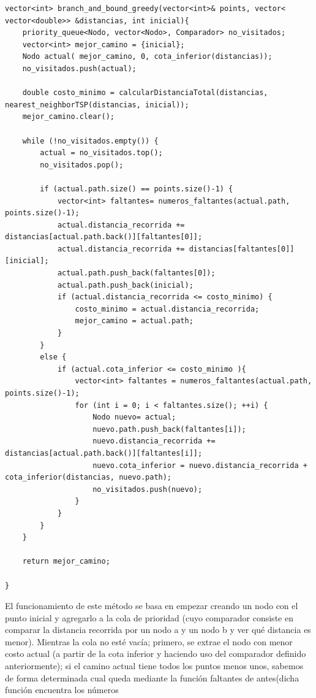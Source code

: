 \documentclass[11pt,openany]{book}
\begin{document}
\begin{lstlisting}
vector<int> branch_and_bound_greedy(vector<int>& points, vector< vector<double>> &distancias, int inicial){
    priority_queue<Nodo, vector<Nodo>, Comparador> no_visitados;
    vector<int> mejor_camino = {inicial};
    Nodo actual( mejor_camino, 0, cota_inferior(distancias));
    no_visitados.push(actual);

    double costo_minimo = calcularDistanciaTotal(distancias, nearest_neighborTSP(distancias, inicial));
    mejor_camino.clear();

    while (!no_visitados.empty()) {
        actual = no_visitados.top();
        no_visitados.pop();

        if (actual.path.size() == points.size()-1) {
            vector<int> faltantes= numeros_faltantes(actual.path, points.size()-1);
            actual.distancia_recorrida += distancias[actual.path.back()][faltantes[0]];
            actual.distancia_recorrida += distancias[faltantes[0]][inicial];
            actual.path.push_back(faltantes[0]);
            actual.path.push_back(inicial);
            if (actual.distancia_recorrida <= costo_minimo) {
                costo_minimo = actual.distancia_recorrida;
                mejor_camino = actual.path;
            }
        } 
        else { 
            if (actual.cota_inferior <= costo_minimo ){
                vector<int> faltantes = numeros_faltantes(actual.path, points.size()-1);
                for (int i = 0; i < faltantes.size(); ++i) {
                    Nodo nuevo= actual;
                    nuevo.path.push_back(faltantes[i]);
                    nuevo.distancia_recorrida += distancias[actual.path.back()][faltantes[i]];
                    nuevo.cota_inferior = nuevo.distancia_recorrida + cota_inferior(distancias, nuevo.path);
                    no_visitados.push(nuevo);
                }
            }
        }
    }

    return mejor_camino;

}
\end{lstlisting}
El funcionamiento de este método se basa en empezar creando un nodo con el punto inicial y agregarlo a la cola de prioridad (cuyo comparador
consiste en comparar la distancia recorrida por un nodo a y un nodo b y ver qué distancia es menor). Mientras la cola no esté vacía; primero,
se extrae el nodo con menor costo actual (a partir de la cota inferior y haciendo uso del comparador definido anteriormente); si el camino actual 
tiene todos los puntos menos unos, sabemos de forma determinada cual queda mediante la función faltantes de antes(dicha función encuentra los números
\end{document}
